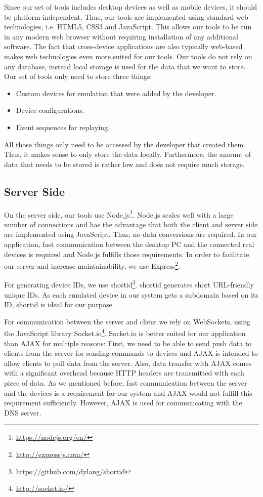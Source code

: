 Since our set of tools includes desktop devices as well as mobile devices, it should be platform-independent. Thus, our tools are implemented using standard web technologies, i.e. HTML5, CSS3 and JavaScript. This allows our tools to be run in any modern web browser without requiring installation of any additional software. The fact that cross-device applications are also typically web-based makes web technologies even more suited for our tools. Our tools do not rely on any database, instead local storage is used for the data that we want to store. Our set of tools only need to store three things:
\begin{itemize}
	\item Custom devices for emulation that were added by the developer.
	\item Device configurations.
	\item Event sequences for replaying.
\end{itemize}
All those things only need to be accessed by the developer that created them. Thus, it makes sense to only store the data locally. Furthermore, the amount of data that needs to be stored is rather low and does not require much storage. 

\subsection{Server Side}

On the server side, our tools use Node.js\footnote{\url{https://nodejs.org/en/}}. Node.js scales well with a large number of connections and has the advantage that both the client and server side are implemented using JavaScript. Thus, no data conversions are required. In our application, fast communication between the desktop PC and the connected real devices is required and Node.js fulfills those requirements. In order to facilitate our server and increase maintainability, we use Express\footnote{\url{http://expressjs.com/}}. 

For generating device IDs, we use shortid\footnote{\url{https://github.com/dylang/shortid}}. shortid generates short URL-friendly unique IDs. As each emulated device in our system gets a subdomain based on its ID, shortid is ideal for our purpose.

For communication between the server and client we rely on WebSockets, using the JavaScript library Socket.io\footnote{\url{http://socket.io/}}. Socket.io is better suited for our application than AJAX for multiple reasons: First, we need to be able to send push data to clients from the server for sending commands to devices and AJAX is intended to allow clients to pull data from the server. Also, data transfer with AJAX comes with a significant overhead because HTTP headers are transmitted with each piece of data. As we mentioned before, fast communication between the server and the devices is a requirement for our system and AJAX would not fulfill this requirement sufficiently. However, AJAX is used for communicating with the DNS server.

